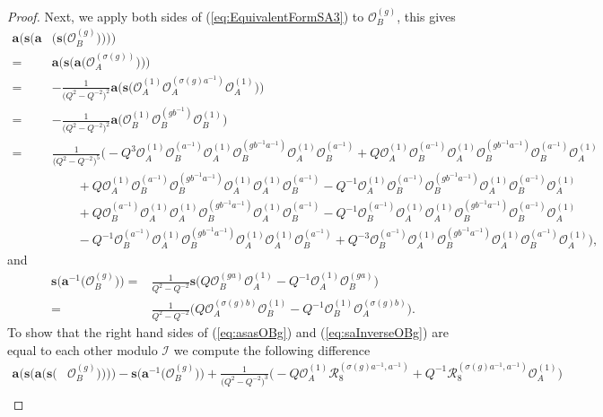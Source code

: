 \documentclass{amsart}
\newcommand{\Oa}{\mathcal O_A}
\newcommand{\Ob}{\mathcal O_B}
\newcommand{\R}{\mathcal R}
\begin{document}
\begin{proof}
Next, we apply both sides of (\ref{eq:EquivalentFormSA3}) to $\Ob^{(g)}$, this gives
\begin{equation}
\begin{aligned}
\mathbf a\big(\mathbf s\big(\mathbf a&\big(\mathbf s\big(\Ob^{(g)}\big)\big)\big)\big)\\
=&\mathbf a\big(\mathbf s\big(\mathbf a\big(\Oa^{(\sigma(g))}\big)\big)\big)\\
=&-\frac1{\big(Q^2-Q^{-2}\big)^2}\mathbf a\Big(\mathbf s\Big(\Oa^{(1)}\Oa^{(\sigma(g)a^{-1})}\Oa^{(1)}\Big)\Big)\\
=&-\frac1{\big(Q^2-Q^{-2}\big)^2}\mathbf a\Big(\Ob^{(1)}\Ob^{(gb^{-1})}\Ob^{(1)}\Big)\\
=&\frac1{\big(Q^2-Q^{-2}\big)^5}\Big(-Q^3\Oa^{(1)}\Ob^{(a^{-1})}\Oa^{(1)}\Ob^{(gb^{-1}a^{-1})}\Oa^{(1)}\Ob^{(a^{-1})}+Q\Oa^{(1)}\Ob^{(a^{-1})}\Oa^{(1)}\Ob^{(gb^{-1}a^{-1})}\Ob^{(a^{-1})}\Oa^{(1)}\\
&\qquad+Q\Oa^{(1)}\Ob^{(a^{-1})}\Ob^{(gb^{-1}a^{-1})}\Oa^{(1)}\Oa^{(1)}\Ob^{(a^{-1})}-Q^{-1}\Oa^{(1)}\Ob^{(a^{-1})}\Ob^{(gb^{-1}a^{-1})}\Oa^{(1)}\Ob^{(a^{-1})}\Oa^{(1)}\\
&\qquad+Q\Ob^{(a^{-1})}\Oa^{(1)}\Oa^{(1)}\Ob^{(gb^{-1}a^{-1})}\Oa^{(1)}\Ob^{(a^{-1})}-Q^{-1}\Ob^{(a^{-1})}\Oa^{(1)}\Oa^{(1)}\Ob^{(gb^{-1}a^{-1})}\Ob^{(a^{-1})}\Oa^{(1)}\\
&\qquad-Q^{-1}\Ob^{(a^{-1})}\Oa^{(1)}\Ob^{(gb^{-1}a^{-1})}\Oa^{(1)}\Oa^{(1)}\Ob^{(a^{-1})}+Q^{-3}\Ob^{(a^{-1})}\Oa^{(1)}\Ob^{(gb^{-1}a^{-1})}\Oa^{(1)}\Ob^{(a^{-1})}\Oa^{(1)}\Big),
\end{aligned}
\label{eq:asasOBg}
\end{equation}
and
\begin{equation}
\begin{aligned}
\mathbf s\Big(\mathbf a^{-1}\Big(\Ob^{(g)}\Big)\Big)=&\frac1{Q^2-Q^{-2}}\mathbf s\Big(Q\Ob^{(ga)}\Oa^{(1)}-Q^{-1}\Oa^{(1)}\Ob^{(ga)}\Big)\\
=&\frac1{Q^2-Q^{-2}}\Big( Q\Oa^{(\sigma(g)b)}\Ob^{(1)}-Q^{-1}\Ob^{(1)}\Oa^{(\sigma(g)b)}\Big).
\end{aligned}
\label{eq:saInverseOBg}
\end{equation}
To show that the right hand sides of (\ref{eq:asasOBg}) and (\ref{eq:saInverseOBg}) are equal to each other modulo $\mathcal I$ we compute the following difference
\begin{equation*}
\begin{aligned}
\mathbf a\big(\mathbf s\big(\mathbf a\big(\mathbf s\big(&\Ob^{(g)}\big)\big)\big)\big)-\mathbf s\big(\mathbf a^{-1}\big(\Ob^{(g)}\big)\big)+\frac1{\big(Q^2-Q^{-2}\big)^3}\Big(-Q\Oa^{(1)}\R_{8}^{(\sigma(g)a^{-1},a^{-1})}+Q^{-1}\R_{8}^{(\sigma(g)a^{-1},a^{-1})}\Oa^{(1)}\Big)\\

\end{aligned}
\end{equation*}
\end{proof}
\end{document}
